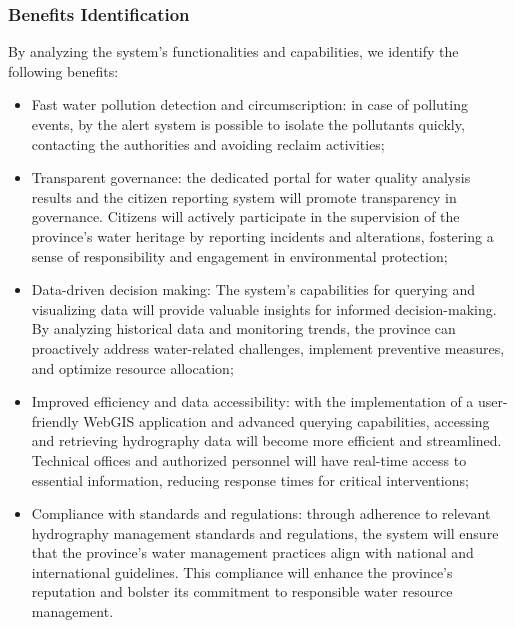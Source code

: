 \subsubsection{Benefits Identification}
By analyzing the system's functionalities and capabilities, we identify the following benefits:
\begin{itemize}
    \item Fast water pollution detection and circumscription: in case of polluting events, by the alert system is possible to isolate the pollutants quickly, contacting the authorities and avoiding reclaim activities;
    \item Transparent governance: the dedicated portal for water quality analysis results and the citizen reporting system will promote transparency in governance. Citizens will actively participate in the supervision of the province's water heritage by reporting incidents and alterations, fostering a sense of responsibility and engagement in environmental protection;
    \item Data-driven decision making: The system's capabilities for querying and visualizing data will provide valuable insights for informed decision-making. By analyzing historical data and monitoring trends, the province can proactively address water-related challenges, implement preventive measures, and optimize resource allocation;
    \item Improved efficiency and data accessibility: with the implementation of a user-friendly WebGIS application and advanced querying capabilities, accessing and retrieving hydrography data will become more efficient and streamlined. Technical offices and authorized personnel will have real-time access to essential information, reducing response times for critical interventions;
    \item Compliance with standards and regulations: through adherence to relevant hydrography management standards and regulations, the system will ensure that the province's water management practices align with national and international guidelines. This compliance will enhance the province's reputation and bolster its commitment to responsible water resource management.
\end{itemize}

